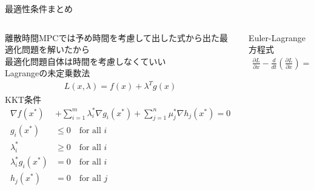 \documentclass[dvipdfmx,12pt]{beamer}
\begin{document}
    \begin{frame}{最適性条件まとめ}
        \fontsize{6.5pt}{6.5pt}\selectfont

        \begin{columns}
            \begin{column}{.5\textwidth}
                \begin{tcolorbox}[title=時間を考慮しない]
                    離散時間MPCでは予め時間を考慮して出した式から出た最適化問題を解いたから\\
                    最適化問題自体は時間を考慮しなくていい\\
                    Lagrangeの未定乗数法\\
                    \begin{align*}
                        L(x, \lambda) = f(x) + \lambda^T g(x)
                    \end{align*}
                    KKT条件\\
                    \begin{align*}
                        \nabla f(x^*) &+ \sum_{i=1}^m \lambda_i^* \nabla g_i(x^*) + \sum_{j=1}^n \mu_j^* \nabla h_j(x^*) = 0 \\
                        g_i(x^*) &\leq 0 \quad \text{for all } i \\
                        \lambda_i^* &\geq 0 \quad \text{for all } i \\
                        \lambda_i^* g_i(x^*) &= 0 \quad \text{for all } i \\
                        h_j(x^*) &= 0 \quad \text{for all } j
                    \end{align*}
                \end{tcolorbox}
            \end{column}

            \begin{column}{.5\textwidth}
                \begin{tcolorbox}[title=時間を考慮]
                    Euler-Lagrange方程式\\
                    \begin{align*}
                        \frac{\partial L}{\partial x} - \frac{d}{dt} \left( \frac{\partial L}{\partial \dot{x}} \right) = 0
                    \end{align*}
                \end{tcolorbox}
            \end{column}
        \end{columns}
    \end{frame}
\end{document}
